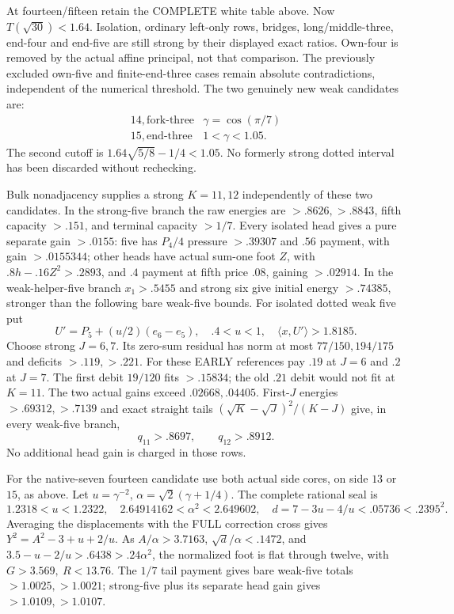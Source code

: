 \documentclass[11pt]{article}
\theoremstyle{definition}
\theoremstyle{remark}
\newcommand{\ip}[2]{\langle #1,#2\rangle}
\begin{document}
At fourteen/fifteen retain the COMPLETE white table above.
Now \(T(\sqrt{30})<1.64\).
Isolation, ordinary left-only rows, bridges, long/middle-three,
end-four and end-five are still strong by their displayed exact ratios.
Own-four is removed by the actual affine principal, not that comparison.
The previously excluded own-five and finite-end-three cases remain
absolute contradictions, independent of the numerical threshold.
The two genuinely new weak candidates are:
\[
 \begin{array}{c|c}
 14,\text{fork-three}&\gamma=\cos(\pi/7)\\
 15,\text{end-three}&1<\gamma<1.05 .
 \end{array}
\]
The second cutoff is
\(1.64\sqrt{5/8}-1/4<1.05\).
No formerly strong dotted interval has been discarded without rechecking.

Bulk nonadjacency supplies a strong \(K=11,12\) independently
of these two candidates. In the strong-five branch the raw energies
are \(>.8626,>.8843\), fifth capacity \(>.151\), and
terminal capacity \(>1/7\).
Every isolated head gives a pure separate gain \(>.0155\):
five has \(P_4/4\) pressure \(>.39307\) and \(.56\) payment,
with gain \(>.0155344\);
other heads have actual sum-one foot \(Z\), with
\(.8h-.16Z^2>.2893\), and \(.4\) payment at fifth price \(.08\),
gaining \(>.02914\).
In the weak-helper-five branch \(x_1>.5455\) and strong six
give initial energy \(>.74385\), stronger than the following
bare weak-five bounds.
For isolated dotted weak five put
\[
 U'=P_5+(u/2)(e_6-e_5),\quad .4<u<1,\quad \ip x{U'}>1.8185.
\]
Choose strong \(J=6,7\). Its zero-sum residual has norm at most
\(77/150,194/175\) and deficits \(>.119,>.221\).
For these EARLY references pay \(.19\) at \(J=6\) and \(.2\)
at \(J=7\). The first debit \(19/120\) fits \(>.15834\);
the old \(.21\) debit would not fit at \(K=11\).
The two actual gains exceed \(.02668,.04405\).
First-\(J\) energies \(>.69312,>.7139\) and exact straight tails
\((\sqrt K-\sqrt J)^2/(K-J)\) give, in every weak-five branch,
\[
 q_{11}>.8697,\qquad q_{12}>.8912 .
\]
No additional head gain is charged in those rows.

For the native-seven fourteen candidate use both actual side cores,
on side \(13\) or \(15\), as above.
Let \(u=\gamma^{-2}\), \(\alpha=\sqrt2(\gamma+1/4)\).
The complete rational seal is
\[
 1.2318<u<1.2322,\quad
 2.64914162<\alpha^2<2.649602,\quad
 d=7-3u-4/u<.05736<.2395^2 .
\]
Averaging the displacements with the FULL correction cross gives
\(Y^2=A^2-3+u+2/u\).
As \(A/\alpha>3.7163\), \(\sqrt d/\alpha<.1472\), and
\(3.5-u-2/u>.6438>.24\alpha^2\), the normalized foot is flat
through twelve, with \(G>3.569,\ R<13.76\).
The \(1/7\) tail payment gives bare weak-five totals
\(>1.0025,>1.0021\); strong-five plus its separate head gain
gives \(>1.0109,>1.0107\).
\end{document}
